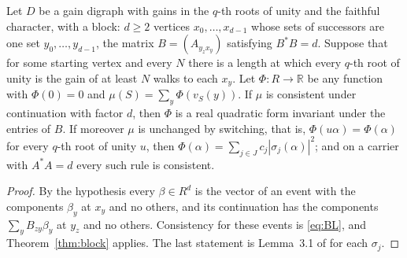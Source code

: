 \begin{corollary}\label{cor:block}
Let $D$ be a gain digraph with gains in the $q$-th roots of unity and the faithful character, with a block: $d\ge2$ vertices $x_0,\dots,x_{d-1}$ whose sets of successors are one set $y_0,\dots,y_{d-1}$, the matrix $B=(A_{y_zx_y})$ satisfying $B^*B=d$. Suppose that for some starting vertex and every $N$ there is a length at which every $q$-th root of unity is the gain of at least $N$ walks to each $x_y$. Let $\Phi\colon R\to\mathbb{R}$ be any function with $\Phi(0)=0$ and $\mu(S)=\sum_y\Phi(v_S(y))$. If $\mu$ is consistent under continuation with factor $d$, then $\Phi$ is a real quadratic form invariant under the entries of $B$. If moreover $\mu$ is unchanged by switching, that is, $\Phi(u\alpha)=\Phi(\alpha)$ for every $q$-th root of unity $u$, then $\Phi(\alpha)=\sum_{j\in J}c_j|\sigma_j(\alpha)|^2$; and on a carrier with $A^*A=d$ every such rule is consistent.
\end{corollary}
\begin{proof}
By the hypothesis every $\beta\in R^d$ is the vector of an event with the components $\beta_y$ at $x_y$ and no others, and its continuation has the components $\sum_yB_{zy}\beta_y$ at $y_z$ and no others. Consistency for these events is \eqref{eq:BL}, and Theorem~\ref{thm:block} applies. The last statement is Lemma~3.1 of \cite{g9} for each $\sigma_j$.
\end{proof}

